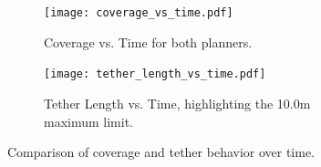 \begin{figure}[t]
    \centering
    \begin{subfigure}[b]{0.48\linewidth}
        \centering
        \texttt{[image: coverage\_vs\_time.pdf]}
        \caption{ Coverage vs. Time for both planners.}
        \label{fig:coverage_vs_time}
    \end{subfigure}
    \hfill
    \begin{subfigure}[b]{0.48\linewidth}
        \centering
        \texttt{[image: tether\_length\_vs\_time.pdf]}
        \caption{Tether Length vs. Time, highlighting the 10.0m maximum limit.}
        \label{fig:tether_vs_time}
    \end{subfigure}
    \caption{Comparison of coverage and tether behavior over time.}
    \label{fig:coverage_tether_sidebyside}
\end{figure}


